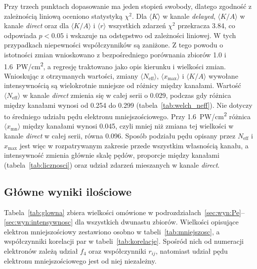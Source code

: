 \documentclass[12pt,a4paper]{article}
\newcommand{\Neff}{N_{\mathrm{eff}}}
\newcommand{\xmax}{x_{\max}}
\newcommand{\PWcm}{PW/cm\textsuperscript{2}}
\begin{document}
Przy trzech punktach dopasowanie ma jeden stopień swobody, dlatego
zgodność z zależnością liniową oceniono statystyką $\chi^2$. Dla
$\langle K\rangle$ w kanale \emph{delayed}, $\langle K/A\rangle$
w kanale \emph{direct} oraz dla $\langle K/A\rangle$ i $\langle r\rangle$
wszystkich zdarzeń $\chi^2$ przekracza \num{3.84}, co odpowiada
$p<\num{0.05}$ i wskazuje na odstępstwo od zależności liniowej. W tych
przypadkach niepewności współczynników są zaniżone. Z tego powodu
o istotności zmian wnioskowano z bezpośredniego porównania zbiorów
\num{1.0} i \num{1.6}~\PWcm, a regresję traktowano jako opis kierunku
i wielkości zmian.
Wnioskując z otrzymanych wartości, zmiany $\langle\Neff\rangle$,
$\langle\xmax\rangle$ i $\langle K/A\rangle$ wywołane intensywnością są
wielokrotnie mniejsze od różnicy między kanałami. Wartość
$\langle\Neff\rangle$ w kanale \emph{direct} zmienia się w całej serii
o \num{0.029}, podczas gdy różnica między kanałami wynosi od
\num{0.254} do \num{0.299} (tabela~\ref{tab:welch_neff}). Nie dotyczy to
średniego udziału pędu elektronu mniejszościowego. Przy
\num{1.6}~\PWcm{} różnica $\langle x_{\mathrm{mn}}\rangle$ między
kanałami wynosi \num{0.045}, czyli mniej niż zmiana tej wielkości
w kanale \emph{direct} w całej serii, równa \num{0.096}. Sposób podziału
pędu opisany przez $\Neff$ i $\xmax$ jest więc w rozpatrywanym zakresie
przede wszystkim własnością kanału, a intensywność zmienia głównie
skalę pędów, proporcje między kanałami (tabela~\ref{tab:licznosci})
oraz udział zdarzeń mieszanych w kanale \emph{direct}.

\subsection{Główne wyniki ilościowe}

Tabela~\ref{tab:glowna} zbiera wielkości omówione w
podrozdziałach~\ref{sec:wyn:Pe}--\ref{sec:wyn:intensywnosc} dla
wszystkich dwunastu zbiorów. Wielkości opisujące elektron mniejszościowy
zestawiono osobno w tabeli~\ref{tab:mniejszosc}, a współczynniki
korelacji par w tabeli~\ref{tab:korelacje}. Spośród nich od numeracji
elektronów zależą udział $f_4$ oraz współczynniki $r_{ij}$, natomiast
udział pędu elektronu mniejszościowego jest od niej niezależny.
\end{document}
